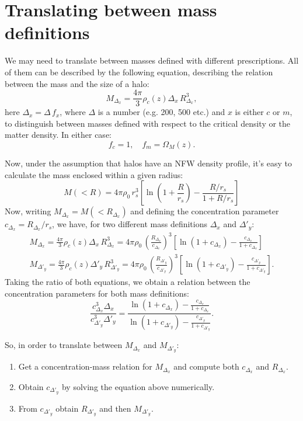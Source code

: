 \documentclass{article}
\begin{document}
\section{Translating between mass definitions}\label{app:massdef}
  We may need to translate between masses defined with different prescriptions. All of them can be described by the following equation, describing the relation between the mass and the size of a halo:
  \begin{equation}
    M_{\Delta_x}=\frac{4\pi}{3}\rho_c(z)\Delta_x\,R_{\Delta_x}^3,
  \end{equation}
  here $\Delta_x=\Delta\,f_x$, where $\Delta$ is a number (e.g. 200, 500 etc.) and $x$ is either $c$ or $m$, to distinguish between masses defined with respect to the critical density or the matter density. In either case:
  \begin{equation}
    f_c=1,\hspace{12pt} f_m=\Omega_M(z).
  \end{equation}

  Now, under the assumption that halos have an NFW density profile, it's easy to calculate the mass enclosed within a given radius:
  \begin{equation}
    M(<R)=4\pi\rho_0\,r_s^3\left[\ln\left(1+\frac{R}{r_s}\right)-\frac{R/r_s}{1+R/r_s}\right]
  \end{equation}
  Now, writing $M_{\Delta_x}=M(<R_{\Delta_x})$ and defining the concentration parameter $c_{\Delta_x}=R_{\Delta_x}/r_s$, we have, for two different mass definitions $\Delta_x$ and $\Delta'_y$:
  \begin{align}
    M_{\Delta_x}=\frac{4\pi}{3}\rho_c(z)\Delta_x\,R_{\Delta_x}^3=4\pi\rho_0\,\left(\frac{R_{\Delta_x}}{c_{\Delta_x}}\right)^3\left[\ln\left(1+c_{\Delta_x}\right)-\frac{c_{\Delta_x}}{1+c_{\Delta_x}}\right]\\
    M_{\Delta'_y}=\frac{4\pi}{3}\rho_c(z)\Delta'_y\,R_{\Delta'_y}^3=4\pi\rho_0\,\left(\frac{R_{\Delta'_y}}{c_{\Delta'_y}}\right)^3\left[\ln\left(1+c_{\Delta'_y}\right)-\frac{c_{\Delta'_y}}{1+c_{\Delta'_y}}\right].
  \end{align}
  Taking the ratio of both equations, we obtain a relation between the concentration parameters for both mass definitions:
  \begin{equation}
    \frac{c_{\Delta_x}^3\Delta_x}{c_{\Delta'_y}^3\Delta'_y}=\frac{\ln\left(1+c_{\Delta_x}\right)-\frac{c_{\Delta_x}}{1+c_{\Delta_x}}}{\ln\left(1+c_{\Delta'_y}\right)-\frac{c_{\Delta'_y}}{1+c_{\Delta'_y}}}.
  \end{equation}

  So, in order to translate between $M_{\Delta_x}$ and $M_{\Delta'_y}$:
  \begin{enumerate}
    \item Get a concentration-mass relation for $M_{\Delta_x}$ and compute both $c_{\Delta_x}$ and $R_{\Delta_x}$.
    \item Obtain $c_{\Delta'_y}$ by solving the equation above numerically.
    \item From $c_{\Delta'_y}$ obtain $R_{\Delta'_y}$ and then $M_{\Delta'_y}$.
  \end{enumerate}
\end{document}
